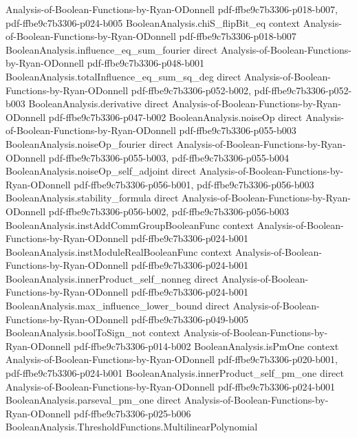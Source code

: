 \begin{theorem}
  {Analysis-of-Boolean-Functions-by-Ryan-ODonnell}
  {pdf-ffbe9c7b3306-p018-b007,
    pdf-ffbe9c7b3306-p024-b005}
\proofstep
  {BooleanAnalysis.chiS_flipBit_eq}
  {context}
  {Analysis-of-Boolean-Functions-by-Ryan-ODonnell}
  {pdf-ffbe9c7b3306-p018-b007}
\proofstep
  {BooleanAnalysis.influence_eq_sum_fourier}
  {direct}
  {Analysis-of-Boolean-Functions-by-Ryan-ODonnell}
  {pdf-ffbe9c7b3306-p048-b001}
\proofstep
  {BooleanAnalysis.totalInfluence_eq_sum_sq_deg}
  {direct}
  {Analysis-of-Boolean-Functions-by-Ryan-ODonnell}
  {pdf-ffbe9c7b3306-p052-b002,
    pdf-ffbe9c7b3306-p052-b003}
\proofstep
  {BooleanAnalysis.derivative}
  {direct}
  {Analysis-of-Boolean-Functions-by-Ryan-ODonnell}
  {pdf-ffbe9c7b3306-p047-b002}
\proofstep
  {BooleanAnalysis.noiseOp}
  {direct}
  {Analysis-of-Boolean-Functions-by-Ryan-ODonnell}
  {pdf-ffbe9c7b3306-p055-b003}
\proofstep
  {BooleanAnalysis.noiseOp_fourier}
  {direct}
  {Analysis-of-Boolean-Functions-by-Ryan-ODonnell}
  {pdf-ffbe9c7b3306-p055-b003,
    pdf-ffbe9c7b3306-p055-b004}
\proofstep
  {BooleanAnalysis.noiseOp_self_adjoint}
  {direct}
  {Analysis-of-Boolean-Functions-by-Ryan-ODonnell}
  {pdf-ffbe9c7b3306-p056-b001,
    pdf-ffbe9c7b3306-p056-b003}
\proofstep
  {BooleanAnalysis.stability_formula}
  {direct}
  {Analysis-of-Boolean-Functions-by-Ryan-ODonnell}
  {pdf-ffbe9c7b3306-p056-b002,
    pdf-ffbe9c7b3306-p056-b003}
\proofstep
  {BooleanAnalysis.instAddCommGroupBooleanFunc}
  {context}
  {Analysis-of-Boolean-Functions-by-Ryan-ODonnell}
  {pdf-ffbe9c7b3306-p024-b001}
\proofstep
  {BooleanAnalysis.instModuleRealBooleanFunc}
  {context}
  {Analysis-of-Boolean-Functions-by-Ryan-ODonnell}
  {pdf-ffbe9c7b3306-p024-b001}
\proofstep
  {BooleanAnalysis.innerProduct_self_nonneg}
  {direct}
  {Analysis-of-Boolean-Functions-by-Ryan-ODonnell}
  {pdf-ffbe9c7b3306-p024-b001}
\proofstep
  {BooleanAnalysis.max_influence_lower_bound}
  {direct}
  {Analysis-of-Boolean-Functions-by-Ryan-ODonnell}
  {pdf-ffbe9c7b3306-p049-b005}
\proofstep
  {BooleanAnalysis.boolToSign_not}
  {context}
  {Analysis-of-Boolean-Functions-by-Ryan-ODonnell}
  {pdf-ffbe9c7b3306-p014-b002}
\proofstep
  {BooleanAnalysis.isPmOne}
  {context}
  {Analysis-of-Boolean-Functions-by-Ryan-ODonnell}
  {pdf-ffbe9c7b3306-p020-b001,
    pdf-ffbe9c7b3306-p024-b001}
\proofstep
  {BooleanAnalysis.innerProduct_self_pm_one}
  {direct}
  {Analysis-of-Boolean-Functions-by-Ryan-ODonnell}
  {pdf-ffbe9c7b3306-p024-b001}
\proofstep
  {BooleanAnalysis.parseval_pm_one}
  {direct}
  {Analysis-of-Boolean-Functions-by-Ryan-ODonnell}
  {pdf-ffbe9c7b3306-p025-b006}
\proofstep
  {BooleanAnalysis.ThresholdFunctions.MultilinearPolynomial}

\end{theorem}
